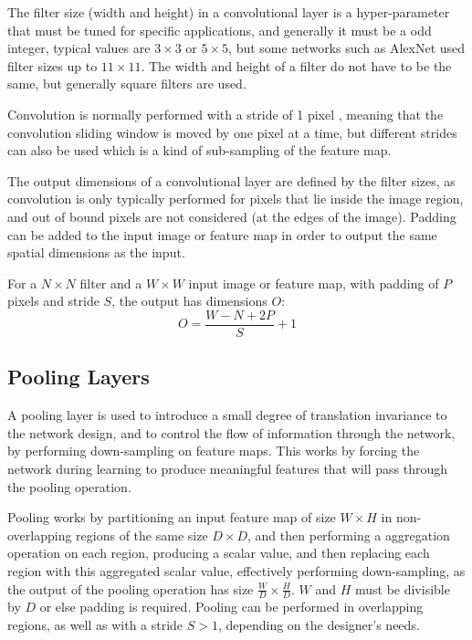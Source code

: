 The filter size (width and height) in a convolutional layer is a hyper-parameter that must be tuned for specific applications, and generally it must be a odd integer, typical values are $3 \times 3$ or $5 \times 5$, but some networks such as AlexNet \cite{krizhevsky2012imagenet} used filter sizes up to $11 \times 11$. The width and height of a filter do not have to be the same, but generally square filters are used.

Convolution is normally performed with a stride of 1 pixel , meaning that the convolution sliding window is moved by one pixel at a time, but different strides can also be used which is a kind of sub-sampling of the feature map.

The output dimensions of a convolutional layer are defined by the filter sizes, as convolution is only typically performed for pixels that lie inside the image region, and out of bound pixels are not considered (at the edges of the image). Padding  can be added to the input image or feature map in order to output the same spatial dimensions as the input.

For a $N \times N$ filter and a $W \times W$ input image or feature map, with padding of $P$ pixels and stride $S$, the output has dimensions $O$:
\vspace*{1em}
\begin{equation}
    O = \frac{W - N + 2P}{S} + 1
\end{equation}

\subsection{Pooling Layers}

A pooling layer is used to introduce a small degree of translation invariance to the network design, and to control the flow of information through the network, by performing down-sampling on feature maps. This works by forcing the network during learning to produce meaningful features that will pass through the pooling operation. 

Pooling works by partitioning  an input feature map of size $W \times H$ in non-overlapping regions of the same size $D \times D$, and then performing a aggregation operation on each region, producing a scalar value, and then replacing each region with this aggregated scalar value, effectively performing down-sampling, as the output of the pooling operation has size $\frac{W}{D} \times \frac{H}{D}$. $W$ and $H$ must be divisible by $D$ or else padding is required. Pooling can be performed in overlapping regions, as well as with a stride $S > 1$, depending on the designer's needs.

